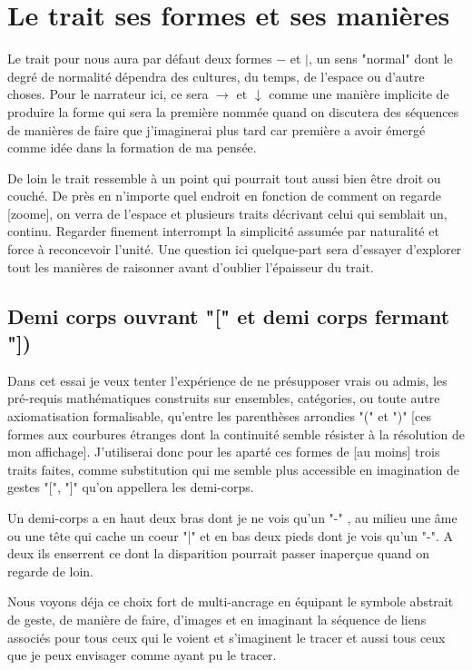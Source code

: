 \documentclass{article}
\begin{document}
\section{ Le trait ses formes et ses manières}
Le trait pour nous aura par défaut deux formes $-$ et $|$, un sens "normal" dont le degré de normalité dépendra des cultures, du temps, de l'espace ou d'autre choses. Pour le narrateur ici, ce sera $\rightarrow$ et $\downarrow$ comme une manière implicite de produire la forme qui sera la première nommée quand on discutera des séquences de  manières  de faire que j'imaginerai plus tard  car première a avoir émergé comme idée dans la formation de ma pensée.
  
 De loin le trait ressemble à un point qui pourrait tout aussi bien être droit ou couché. De près en n'importe quel endroit  en fonction de comment on regarde [zoome],  on verra de l'espace et plusieurs  traits décrivant celui qui semblait un, continu. Regarder finement interrompt la simplicité assumée par naturalité et force à reconcevoir l'unité. Une question ici quelque-part sera d'essayer d'explorer tout les manières de raisonner avant d'oublier l'épaisseur du trait.
  
   \subsection{Demi corps ouvrant  "["  et demi corps fermant "])}
 
 Dans cet essai je veux tenter l'expérience de ne présupposer vrais ou admis, les pré-requis  mathématiques construits sur ensembles, catégories,  ou toute autre axiomatisation formalisable, qu'entre  les parenthèses arrondies "(" et ")" [ces formes aux courbures étranges  dont la continuité semble résister à la résolution de mon affichage]. J'utiliserai donc pour les aparté ces formes de [au moins]  trois traits faites, comme substitution qui me semble  plus accessible  en imagination de gestes "[", "]" qu'on appellera les demi-corps.
 
 Un demi-corps a en haut deux bras dont je ne vois qu'un "-" , au milieu   une âme ou une tête qui cache un coeur  "|" et en bas deux pieds dont je vois qu'un "-".
 A deux ils enserrent ce dont la disparition pourrait passer inaperçue quand on regarde de loin.
 
 Nous voyons déja ce choix fort de multi-ancrage en équipant le symbole abstrait de geste, de manière de faire, d'images et en imaginant la séquence de liens associés pour tous ceux qui le voient et s'imaginent le tracer et aussi tous ceux que je peux envisager comme ayant pu le tracer.
 
\end{document}
